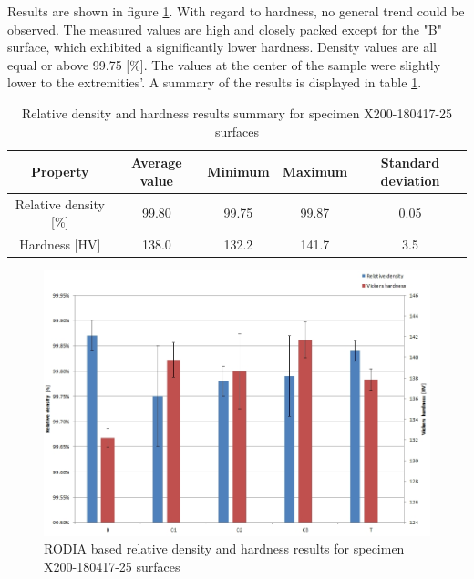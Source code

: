 Results are shown in figure \ref{fig:HD-180417}. With regard to hardness, no general trend could be observed. The measured values are high and closely packed except for the "B" surface, which exhibited a significantly lower hardness. Density values are all equal or above 99.75 [\%]. The values at the center of the sample were slightly lower to the extremities'. A summary of the results is displayed in table \ref{tab:25}.

 \begin{center}
	\begin{table}[ht]
		\begin{tabular}{|c|c |c |c| c|}
			\hline
			Property& Average value & Minimum & Maximum & Standard deviation \\
			\hline 
			\hline   
			Relative density [\%] & 99.80 & 99.75 & 99.87 & 0.05\\
			Hardness [HV] &138.0 &132.2 &141.7&3.5\\
			\hline
		\end{tabular}

		\caption[Relative density and hardness results summary for specimen X200-180417-25 surfaces]{Relative density and hardness results summary for specimen X200-180417-25 surfaces}
		\label{tab:25}
	\end{table}
\end{center}


\begin{figure}[ht]
\centering
\centerline{\includegraphics[scale=0.62]{Images/HD-180417}}
\decoRule
\caption[RODIA based relative density and hardness results for specimen X200-180417-25 surfaces]{RODIA based relative density and hardness results for specimen X200-180417-25 surfaces}
\label{fig:HD-180417}
\end{figure} 

